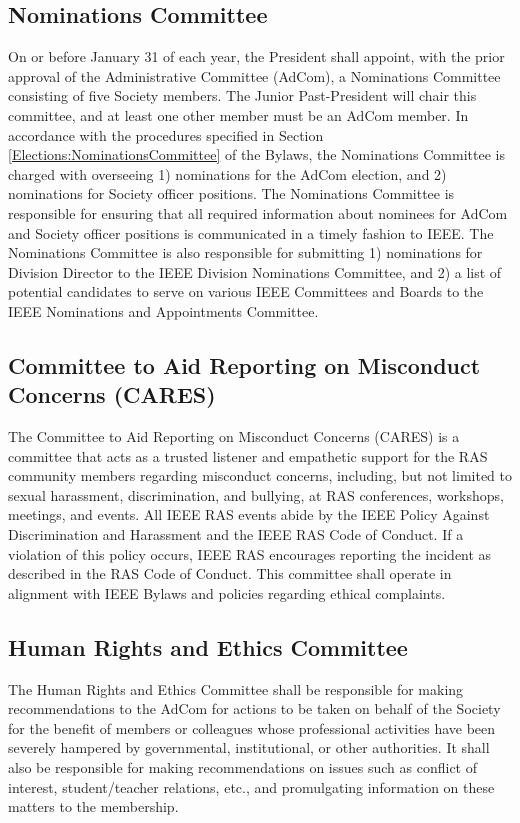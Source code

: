 \documentclass[10pt]{article}
\newcommand{\secref}[1]{Section \ref{#1}}
\begin{document}
\subsection{Nominations Committee}

On or before January 31 of each year, the President shall appoint, with the prior approval of the Administrative Committee (AdCom), a Nominations Committee consisting of five Society members. The Junior Past-President will chair this committee, and at least one other member must be an AdCom member. In accordance with the procedures specified in \secref{Elections:NominationsCommittee} of the Bylaws, the Nominations Committee is charged with overseeing 1) nominations for the AdCom election, and 2) nominations for Society officer positions. The Nominations Committee is responsible for ensuring that all required information about nominees for AdCom and Society officer positions is communicated in a timely fashion to IEEE. The Nominations Committee is also responsible for submitting 1) nominations for Division Director to the IEEE Division Nominations Committee, and 2) a list of potential candidates to serve on various IEEE Committees and Boards to the IEEE Nominations and Appointments Committee.


\subsection{Committee to Aid Reporting on Misconduct Concerns (CARES)}

The Committee to Aid Reporting on Misconduct Concerns (CARES) is a committee that acts as a trusted listener and empathetic support for the RAS community members regarding misconduct concerns, including, but not limited to sexual harassment, discrimination, and bullying, at RAS conferences, workshops, meetings, and events. All IEEE RAS events abide by the IEEE Policy Against Discrimination and Harassment and the IEEE RAS Code of Conduct. If a violation of this policy occurs, IEEE RAS encourages reporting the incident as described in the RAS Code of Conduct. This committee shall operate in alignment with IEEE Bylaws and policies regarding ethical complaints.

\subsection{Human Rights and Ethics Committee}

The Human Rights and Ethics Committee shall be responsible for making recommendations to the AdCom for actions to be taken on behalf of the Society for the benefit of members or colleagues whose professional activities have been severely hampered by governmental, institutional, or other authorities.    It shall also be responsible for making recommendations on issues such as conflict of interest, student/teacher relations, etc., and promulgating information on these matters to the membership. 
\end{document}
